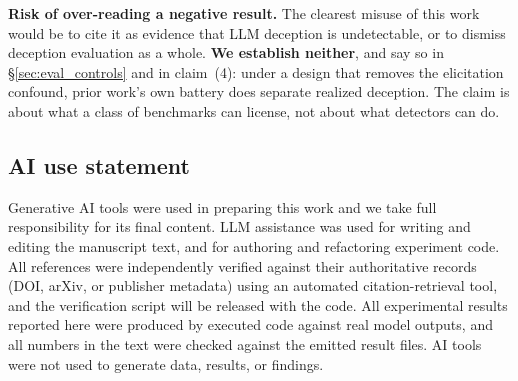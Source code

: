 \documentclass{article} %
\begin{document}
\textbf{Risk of over-reading a negative result.} The clearest misuse of this work
would be to cite it as evidence that LLM deception is undetectable, or to dismiss
deception evaluation as a whole. \textbf{We establish neither}, and say so in
§\ref{sec:eval_controls} and in claim~(4): under a design that removes the
elicitation confound, prior work's own battery does separate realized deception.
The claim is about what a class of benchmarks can license, not about what
detectors can do.

\subsection*{AI use statement}
Generative AI tools were used in preparing this work and we take full
responsibility for its final content. LLM assistance was used for writing and
editing the manuscript text, and for authoring and refactoring experiment code.
All references were independently verified against their authoritative records
(DOI, arXiv, or publisher metadata) using an automated citation-retrieval tool,
and the verification script will be released with the code. All experimental
results reported here were produced by executed code against real model outputs, and
all numbers in the text were checked against the emitted result files. AI tools
were not used to generate data, results, or findings.
\end{document}
